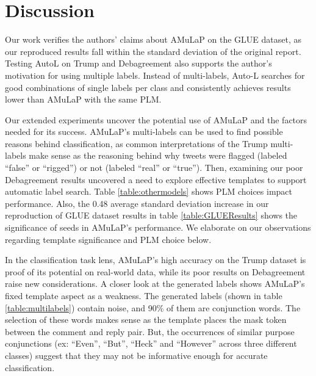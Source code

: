 \section{Discussion}
\label{section:discussion}


Our work verifies the authors' claims about AMuLaP on the GLUE dataset, as our reproduced results fall within the standard deviation of the original report. Testing AutoL on Trump and Debagreement also supports the author's motivation for using multiple labels. Instead of multi-labels, Auto-L searches for good combinations of single labels per class and consistently achieves results lower than AMuLaP with the same PLM. 

\hfill \break
Our extended experiments uncover the potential use of AMuLaP and the factors needed for its success. AMuLaP's multi-labels can be used to find possible reasons behind classification, as common interpretations of the Trump multi-labels make sense as the reasoning behind why tweets were flagged (labeled ``false'' or ``rigged'') or not (labeled ``real'' or ``true''). Then, examining our poor Debagreement results uncovered a need to explore effective templates to support automatic label search. Table \ref{table:othermodels} shows PLM choices impact performance. Also, the 0.48 average standard deviation increase in our reproduction of GLUE dataset results in table \ref{table:GLUEResults} shows the significance of seeds in AMuLaP's performance. We elaborate on our observations regarding template significance and PLM choice below.

\hfill \break
In the classification task lens, AMuLaP's high accuracy on the Trump dataset is proof of its potential on real-world data, while its poor results on Debagreement raise new considerations. A closer look at the generated labels shows AMuLaP's fixed template aspect as a weakness. The generated labels (shown in table \ref{table:multilabels}) contain noise, and 90\% of them are conjunction words. The selection of these words makes sense as the template places the mask token between the comment and reply pair. But, the occurrences of similar purpose conjunctions (ex: ``Even'', ``But'', ``Heck'' and ``However'' across three different classes) suggest that they may not be informative enough for accurate classification. 

